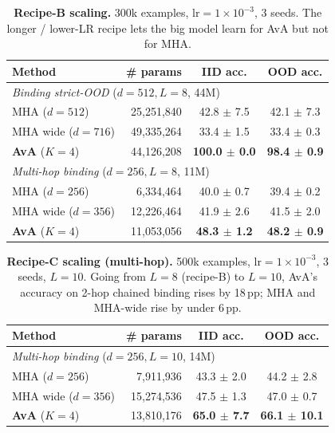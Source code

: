\documentclass{article}
\begin{document}
\begin{table}[h]
\centering
\caption{\textbf{Recipe-B scaling.} 300k examples,
$\mathrm{lr}{=}1\!\times\!10^{-3}$, 3 seeds. The longer / lower-LR
recipe lets the big model learn for AvA but not for MHA.}
\label{tab:scaling-B}
\begin{tabular}{lrcc}
\toprule
Method & \# params & IID acc. & OOD acc. \\
\midrule
\multicolumn{4}{l}{\textit{Binding strict-OOD} ($d{=}512, L{=}8$, 44M)} \\
\hspace{1em} MHA ($d{=}512$)            & 25,251,840 & 42.8 $\pm$ 7.5 & 42.1 $\pm$ 7.3 \\
\hspace{1em} MHA wide ($d{=}716$)       & 49,335,264 & 33.4 $\pm$ 1.5 & 33.4 $\pm$ 0.3 \\
\hspace{1em} \textbf{AvA} ($K{=}4$)     & 44,126,208 & \textbf{100.0 $\pm$ 0.0} & \textbf{98.4 $\pm$ 0.9} \\
\midrule
\multicolumn{4}{l}{\textit{Multi-hop binding} ($d{=}256, L{=}8$, 11M)} \\
\hspace{1em} MHA ($d{=}256$)            & 6,334,464 & 40.0 $\pm$ 0.7 & 39.4 $\pm$ 0.2 \\
\hspace{1em} MHA wide ($d{=}356$)       & 12,226,464 & 41.9 $\pm$ 2.6 & 41.5 $\pm$ 2.0 \\
\hspace{1em} \textbf{AvA} ($K{=}4$)     & 11,053,056 & \textbf{48.3 $\pm$ 1.2} & \textbf{48.2 $\pm$ 0.9} \\
\bottomrule
\end{tabular}
\end{table}

\begin{table}[h]
\centering
\caption{\textbf{Recipe-C scaling (multi-hop).} 500k examples,
$\mathrm{lr}{=}1\!\times\!10^{-3}$, 3 seeds, $L{=}10$.
Going from $L{=}8$ (recipe-B) to $L{=}10$, AvA's accuracy on
2-hop chained binding rises by 18\,pp; MHA and MHA-wide rise by
under 6\,pp.}
\label{tab:scaling-C}
\begin{tabular}{lrcc}
\toprule
Method & \# params & IID acc. & OOD acc. \\
\midrule
\multicolumn{4}{l}{\textit{Multi-hop binding} ($d{=}256, L{=}10$, 14M)} \\
\hspace{1em} MHA ($d{=}256$)            &  7,911,936 & 43.3 $\pm$ 2.0 & 44.2 $\pm$ 2.8 \\
\hspace{1em} MHA wide ($d{=}356$)       & 15,274,536 & 47.5 $\pm$ 1.3 & 47.0 $\pm$ 0.7 \\
\hspace{1em} \textbf{AvA} ($K{=}4$)     & 13,810,176 & \textbf{65.0 $\pm$ 7.7} & \textbf{66.1 $\pm$ 10.1} \\
\bottomrule
\end{tabular}
\end{table}
\end{document}
